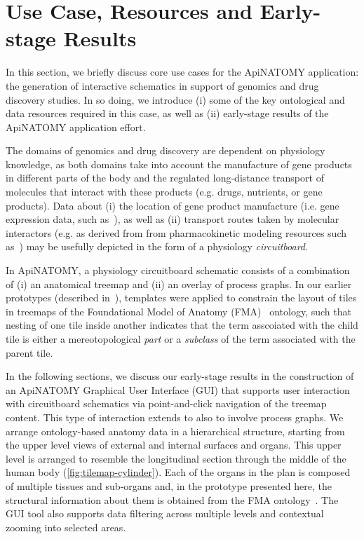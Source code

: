\section{Use Case, Resources and Early-stage Results} \label{sect:motivation}            %

In this section, we briefly discuss core use cases for the ApiNATOMY application: the generation of interactive schematics in support of genomics and drug discovery studies. In so doing, we introduce (i) some of the key ontological and data resources required in this case, as well as (ii) early-stage results of the ApiNATOMY application effort.

The domains of genomics and drug discovery are dependent on physiology knowledge, as both domains take into account the manufacture of gene products in different parts of the body and the regulated long-distance transport of molecules that interact with these products (e.g. drugs, nutrients, or gene products). Data about (i) the location of gene product manufacture (i.e. gene expression data, such as~\cite{EBI}), as well as (ii) transport routes taken by molecular interactors (e.g. as derived from from pharmacokinetic modeling resources such as~\cite{HMC+13}) may be usefully depicted in the form of a physiology \emph{circuitboard}.

In ApiNATOMY, a physiology circuitboard schematic consists of a combination of (i) an anatomical treemap and (ii) an overlay of process graphs. In our earlier prototypes (described in~\cite{BGS12,KBK14}), templates were applied to constrain the layout of tiles in treemaps of the Foundational Model of Anatomy (FMA)~\cite{RM03} ontology, such that nesting of one tile inside another indicates that the term asscoiated with the child tile is either a mereotopological \emph{part} or a \emph{subclass} of the term associated with the parent tile. 

In the following sections, we discuss our early-stage results in the construction of an ApiNATOMY Graphical User Interface (GUI) that supports user interaction with circuitboard schematics via point-and-click navigation of the treemap content. This type of interaction extends to also to involve process graphs. We arrange ontology-based anatomy data in a hierarchical structure, starting from the upper level views of external and internal surfaces and organs. This upper level is arranged to resemble the longitudinal section through the middle of the human body (\cref{fig:tilemap-cylinder}). Each of the organs in the plan is composed of multiple tissues and sub-organs and, in the prototype presented here, the structural information about them is obtained from the FMA ontology~\cite{RM03}. The GUI tool also supports data filtering across multiple levels and contextual zooming into selected areas.

